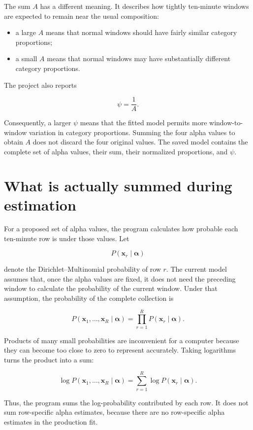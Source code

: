\documentclass[11pt,a4paper]{article}
\begin{document}
The sum $A$ has a different meaning.  It describes how tightly ten-minute
windows are expected to remain near the usual composition:

\begin{itemize}
  \item a large $A$ means that normal windows should have fairly similar
        category proportions;
  \item a small $A$ means that normal windows may have substantially different
        category proportions.
\end{itemize}

The project also reports

\[
\psi=\frac{1}{A}.
\]

Consequently, a larger $\psi$ means that the fitted model permits more
window-to-window variation in category proportions.  Summing the four alpha
values to obtain $A$ does not discard the four original values.  The saved
model contains the complete set of alpha values, their sum, their normalized
proportions, and $\psi$.

\section{What is actually summed during estimation}

For a proposed set of alpha values, the program calculates how probable each
ten-minute row is under those values.  Let

\[
P(\mathbf{x}_r\mid\boldsymbol{\alpha})
\]

denote the Dirichlet--Multinomial probability of row $r$.  The current model
assumes that, once the alpha values are fixed, it does not need the preceding
window to calculate the probability of the current window.  Under that
assumption, the probability of the complete collection is

\[
P(\mathbf{x}_1,\ldots,\mathbf{x}_R\mid\boldsymbol{\alpha})
=
\prod_{r=1}^{R}
P(\mathbf{x}_r\mid\boldsymbol{\alpha}).
\]

Products of many small probabilities are inconvenient for a computer because
they can become too close to zero to represent accurately.  Taking logarithms
turns the product into a sum:

\[
\log P(\mathbf{x}_1,\ldots,\mathbf{x}_R\mid\boldsymbol{\alpha})
=
\sum_{r=1}^{R}
\log P(\mathbf{x}_r\mid\boldsymbol{\alpha}).
\]

Thus, the program sums the log-probability contributed by each row.  It does
not sum row-specific alpha estimates, because there are no row-specific alpha
estimates in the production fit.
\end{document}
